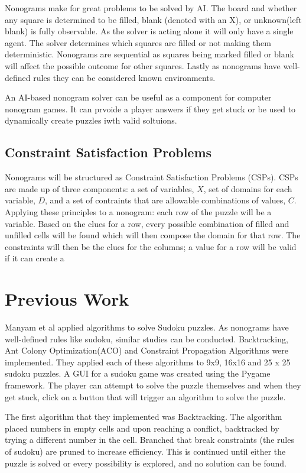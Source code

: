 \documentclass[12pt, letterpaper]{article}
\begin{document}
    Nonograms make for great problems to be solved by AI. The board and whether any square is determined to be filled, blank (denoted with an X), or unknown(left blank) is fully observable. As the solver is acting alone it will only have a single agent. The solver determines which squares are filled or not making them deterministic. Nonograms are sequential as squares being marked filled or blank will affect the possible outcome for other squares. Lastly as nonograms have well-defined rules they can be considered known environments. 
    
    An AI-based nonogram solver can be useful as a component for computer nonogram games. It can prvoide a player answers if they get stuck or be used to dynamically create puzzles iwth valid soltuions.

    \subsection{Constraint Satisfaction Problems}
    Nonograms will be structured as Constraint Satisfaction Problems (CSPs). CSPs are made up of three components: a set of variables, $X$, set of domains for each variable, $D$, and a set of contraints that are allowable combinations of values, $C$. Applying these principles to a nonogram: each row of the puzzle will be a variable. Based on the clues for a row, every possible combination of filled and unfilled cells will be found which will then compose the domain for that row. The constraints will then be the clues for the columns; a value for a row will be valid if it can create a






\section{Previous Work}
    Manyam et al \cite{10863160} applied algorithms to solve Sudoku puzzles. As nonograms have well-defined rules like sudoku, similar studies can be conducted. Backtracking, Ant Colony Optimization(ACO) and Constraint Propagation Algorithms were implemented. They applied each of these algorithms to 9x9, 16x16 and 25 x 25 sudoku puzzles. A GUI for a sudoku game was created using the Pygame framework. The player can attempt to solve the puzzle themselves and when they get stuck, click on a button that will trigger an algorithm to solve the puzzle.

    The first algorithm that they implemented was Backtracking. The algorithm placed numbers in empty cells and upon reaching a conflict, backtracked by trying a different number in the cell. Branched that break constraints (the rules of sudoku) are pruned to increase efficiency. This is continued until either the puzzle is solved or every possibility is explored, and no solution can be found.
\end{document}
